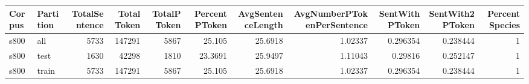 \begin{tabular}{llrrrrrrrrr}
\hline
 Corpus   & Partition   &   TotalSentence &   TotalToken &   TotalPToken &   PercentPToken &   AvgSentenceLength &   AvgNumberPTokenPerSentence &   SentWithPToken &   SentWith2PToken &   PercentSpecies \\
\hline
 s800     & all         &            5733 &       147291 &          5867 &         25.105  &             25.6918 &                      1.02337 &         0.296354 &          0.238444 &                1 \\
 s800     & test        &            1630 &        42298 &          1810 &         23.3691 &             25.9497 &                      1.11043 &         0.29816  &          0.252147 &                1 \\
 s800     & train       &            5733 &       147291 &          5867 &         25.105  &             25.6918 &                      1.02337 &         0.296354 &          0.238444 &                1 \\
\hline
\end{tabular}